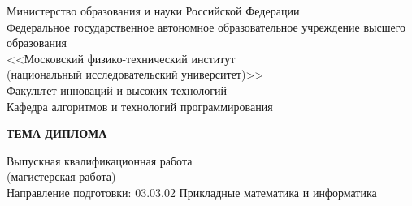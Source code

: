 \thispagestyle{empty}%
\begin{center}%
\small{Министерство образования и науки Российской Федерации}\\
Федеральное государственное автономное образовательное учреждение высшего\\
образования\\
<<Московский физико-технический институт\\
(национальный исследовательский университет)>>\\
\normalsize {Факультет инноваций и высоких технологий}\\
\small{Кафедра алгоритмов и технологий программирования}
\end{center}%
%
%
%
\vspace{0pt plus3fill} %
%
\vspace{0pt plus1fill} %
\begin{center}%
\textbf {\large \MakeUppercase{Тема диплома}}

\vspace{0pt plus1fill} %
{%
Выпускная квалификационная работа\\
(магистерская работа)\\
}
\vspace{0pt plus1fill}
{
Направление подготовки: 03.03.02 Прикладные математика и информатика
}

\end{center}%
